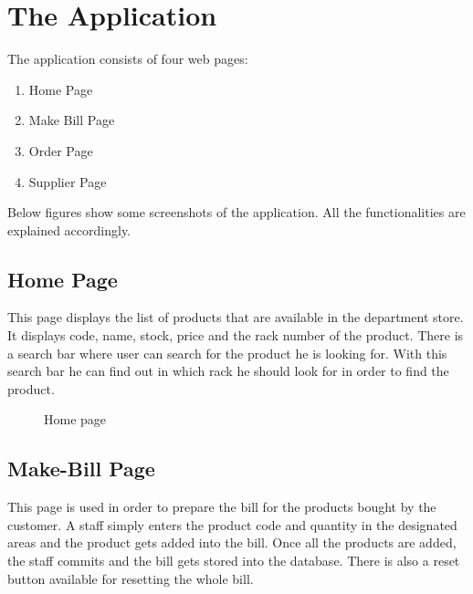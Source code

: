 \section{The Application}

The application consists of four web pages:
\begin{enumerate}[noitemsep,topsep=0pt]
  \item Home Page
  \item Make Bill Page
  \item Order Page
  \item Supplier Page
\end{enumerate}

Below figures show some screenshots of the application. All the
functionalities are explained accordingly.

\subsection{Home Page}

This page displays the list of products that are available
in the department store. It displays code, name, stock, price and the rack
number of the product. There is a search bar where user can search for the
product he is looking for. With this search bar he can find out in which rack
he should look for in order to find the product.

\begin{figure}[h!]\centering
  \caption{Home page}\label{fig:home}
\end{figure}

\subsection{Make-Bill Page}

This page is used in order to prepare the bill for the products
bought by the customer. A staff simply enters the product code and quantity in
the designated areas and the product gets added into the bill. Once all the
products are added, the staff commits and the bill gets stored into the
database. There is also a reset button available for resetting the whole bill.

